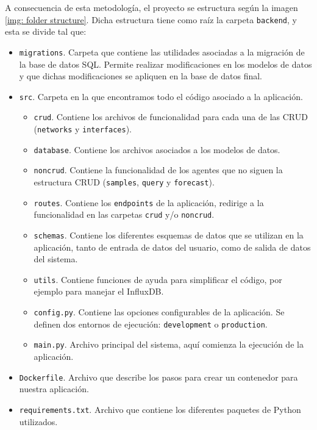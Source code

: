 \documentclass[a4paper, oneside, 12pt]{book}
\begin{document}
	\noindent A consecuencia de esta metodología, el proyecto se estructura según la imagen \ref{img: folder structure}. Dicha estructura tiene como raíz la carpeta \texttt{backend}, y esta se divide tal que:
	
	\begin{itemize}
		\item \texttt{migrations}. Carpeta que contiene las utilidades asociadas a la migración de la base de datos SQL. Permite realizar modificaciones en los modelos de datos y que dichas modificaciones se apliquen en la base de datos final.
		\item \texttt{src}. Carpeta en la que encontramos todo el código asociado a la aplicación.
			\begin{itemize}
				\item \texttt{crud}. Contiene los archivos de funcionalidad para cada una de las CRUD (\texttt{networks} y \texttt{interfaces}).
				\item \texttt{database}. Contiene los archivos asociados a los modelos de datos.
				\item \texttt{noncrud}. Contiene la funcionalidad de los agentes que no siguen la estructura CRUD (\texttt{samples}, \texttt{query} y \texttt{forecast}).
				\item \texttt{routes}. Contiene los \texttt{endpoints} de la aplicación, redirige a la funcionalidad en las carpetas \texttt{crud} y/o \texttt{noncrud}.
				\item \texttt{schemas}. Contiene los diferentes esquemas de datos que se utilizan en la aplicación, tanto de entrada de datos del usuario, como de salida de datos del sistema.
				\item \texttt{utils}. Contiene funciones de ayuda para simplificar el código, por ejemplo para manejar el InfluxDB.
				\item \texttt{config.py}. Contiene las opciones configurables de la aplicación. Se definen dos entornos de ejecución: \texttt{development} o \texttt{production}.
				\item \texttt{main.py}. Archivo principal del sistema, aquí comienza la ejecución de la aplicación.
			\end{itemize}
		
		\item \texttt{Dockerfile}. Archivo que describe los pasos para crear un contenedor para nuestra aplicación.
		\item \texttt{requirements.txt}. Archivo que contiene los diferentes paquetes de Python utilizados.
	\end{itemize}
	
\end{document}
